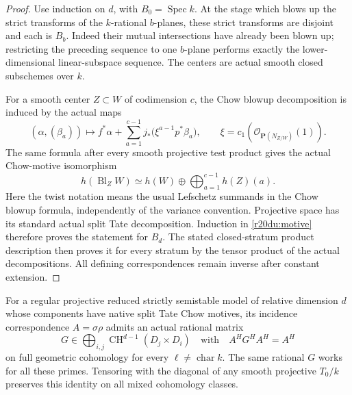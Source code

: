 \begin{proof}
Use induction on $d$, with $B_0=\operatorname{Spec}k$.
At the stage which blows up the strict transforms of the
$k$-rational $b$-planes, these strict transforms are disjoint and
each is $B_b$.  Indeed their mutual intersections have already been
blown up; restricting the preceding sequence to one $b$-plane
performs exactly the lower-dimensional linear-subspace sequence.
The centers are actual smooth closed subschemes over $k$.

For a smooth center $Z\subset W$ of codimension $c$, the Chow
blowup decomposition is induced by the actual maps
\[
 (\alpha,(\beta_a))\longmapsto
 f^*\alpha+\sum_{a=1}^{c-1}
 j_*\bigl(\xi^{a-1}p^*\beta_a\bigr),
 \qquad \xi=c_1(\mathcal O_{\mathbf P(N_{Z/W})}(1)).
 \tag{DU20.1}\label{r20du:blowup}
\]
The same formula after every smooth projective test product gives
the actual Chow-motive isomorphism
\[
 h(\operatorname{Bl}_Z W)
 \simeq h(W)\oplus\bigoplus_{a=1}^{c-1}h(Z)(a).
 \tag{DU20.2}\label{r20du:motive}
\]
Here the twist notation means the usual Lefschetz summands in the
Chow blowup formula, independently of the variance convention.
Projective space has its standard actual split Tate decomposition.
Induction in \eqref{r20du:motive} therefore proves the statement
for $B_d$.  The stated closed-stratum product description then
proves it for every stratum by the tensor product of the actual
decompositions.  All defining correspondences remain inverse
after constant extension.
\end{proof}

\begin{lemma}
\label{r20du:inverse}
For a regular projective reduced strictly semistable model of
relative dimension $d$ whose components have native split Tate
Chow motives, its incidence correspondence
$A=\sigma\rho$ admits an actual rational matrix
\[
 G\in\bigoplus_{i,j}\operatorname{CH}^{d-1}(D_j\times D_i)
 \quad\text{with}\quad A^H G^H A^H=A^H
 \tag{DU20.3}\label{r20du:inverse-eq}
\]
on full geometric cohomology for every $\ell\ne\operatorname{char}k$.
The same rational $G$ works for all these primes.  Tensoring with
the diagonal of any smooth projective $T_0/k$ preserves this
identity on all mixed cohomology classes.
\end{lemma}

